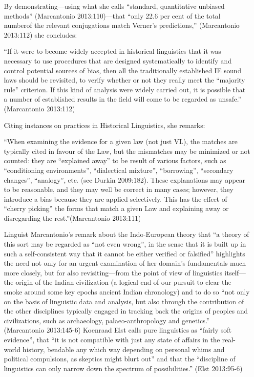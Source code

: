 By demonstrating—using what she calls “standard, quantitative unbiased methods” (Marcantonio 2013:110)—that “only 22.6 per cent of the total numberof the relevant conjugations match Verner’s predictions,” (Marcantonio 2013:112) she concludes:

\begin{myquote}
“If it were to become widely accepted in historical linguistics that it was necessary to use procedures that are designed systematically to identify and control potential sources of bias, then all the traditionally established IE sound laws should be revisited, to verify whether or not they really meet the “majority rule” criterion. If this kind of analysis were widely carried out, it is possible that a number of established results in the field will come to be regarded as unsafe.” \hfill (Marcantonio 2013:112)
\end{myquote}

Citing instances on practices in Historical Linguistics, she remarks:

\begin{myquote}
“When examining the evidence for a given law (not just VL), the matches are typically cited in favour of the Law, but the mismatches may be minimized or not counted: they are “explained away” to be result of various factors, such as “conditioning environments”, “dialectical mixture”, “borrowing”, “secondary changes”, “analogy”, etc. (see Durkin 2009:182). These explanations may appear to be reasonable, and they may well be correct in many cases; however, they introduce a bias because they are applied selectively. This has the effect of “cherry picking” the forms that match a given Law and explaining away or disregarding the rest.”\hfill (Marcantonio 2013:111)
\end{myquote}

Linguist Marcantonio’s remark about the Indo-European theory that “a theory of this sort may be regarded as “not even wrong”, in the sense that it is built up in such a self-consistent way that it cannot be either verified or falsified” highlights the need not only for an urgent examination of her domain’s fundamentals much more closely, but for also revisiting—from the point of view of linguistics itself—the origin of the Indian civilization (a logical end of our pursuit to clear the smoke around some key epochs ancient Indian chronology) and to do so “not only on the basis of linguistic data and analysis, but also through the contribution of the other disciplines typically engaged in tracking back the origins of peoples and civilizations, such as archaeology, palaeo-anthropology and genetics.” (Marcantonio 2013:145-6) Koenraad Elst calls pure linguistics as “fairly soft evidence”, that “it is not compatible with just any state of affairs in the real-world history, bendable any which way depending on personal whims and political compulsions, as skeptics might blurt out” and that the “discipline of linguistics can only narrow down the spectrum of possibilities.” (Elst 2013:95-6)

